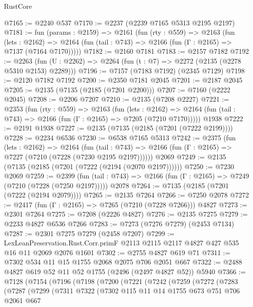 \begin{lexlean}{RustCore}
\begin{coremodule}
@7165 := @2240 @537
@7170 := @2237 (@2239 @7165 @5313 @2195 @2197)
@7181 := fun (params : @2159) =>
  @2161
    (fun (rty : @559) =>
    @2163
      (fun (lets : @2162) =>
      @2164 (fun (tail : @743) => @2166 (fun (Γ : @2165) => @7137 (@7164 @7170)))))
@7182 := @2160 @7181
@7183 := @2157 @7182
@7192 := @2263 (fun (U : @2262) => @2264 (fun (t : @7) => @2272 (@2135 (@2278 @5310 @2153) @2289)))
@7196 := @7157 (@7183 @7192) (@2345 @7129)
@7198 := @2120 @7182 @7192
@7200 := @2350 @7181 @2045
@7201 := @2187 @2045
@7205 := @2135 (@7135 (@2185 (@7201 @2200)))
@7207 := @7160 (@2222 @2045)
@7208 := @2206 @7207
@7210 := @2135 (@7208 @2227)
@7221 := @2353
    (fun (rty : @559) =>
    @2163
      (fun (lets : @2162) =>
      @2164 (fun (tail : @743) => @2166 (fun (Γ : @2165) => @7205 (@7210 @7170)))))
    @1938
@7222 := @2191 @1938
@7227 := @2135 (@7135 (@2185 (@7201 (@7222 @2199))))
@7228 := @2234 @6536
@7230 := @6538 @7165 @5313
@7242 := @2375
    (fun (lets : @2162) =>
    @2164
      (fun (tail : @743) => @2166 (fun (Γ : @2165) => @7227 (@7210 (@7228 (@7230 @2195 @2197))))))
    @2069
@7249 := @2135 (@7135 (@2185 (@7201 (@7222 (@2194 (@2070 @2197))))))
@7250 := @7230 @2069
@7259 := @2399
    (fun (tail : @743) => @2166 (fun (Γ : @2165) => @7249 (@7210 (@7228 (@7250 @2197)))))
    @2078
@7264 := @7135 (@2185 (@7201 (@7222 (@2194 @2079))))
@7265 := @2135 @7264
@7266 := @7250 @2078
@7272 := @2417 (fun (Γ : @2165) => @7265 (@7210 (@7228 @7266))) @4827
@7273 := @2301 @7264
@7275 := @7208 (@2226 @4827)
@7276 := @2135 @7275
@7279 := @2233 @4827 @6536 @7266
@7283 := @7273 (@7276 @7279) (@2453 @7134)
@7287 := @2301 @7275 @7279 (@2458 @7207)
@7299 := LexLeanPreservation.Rust.Corr.primF
    @2113
    @2115
    @2117
    @4827
    @427
    @535
    @16
    @11
    @2069
    @2076
    @1601
@7302 := @2755 @4827 @619 @71
@7311 := @7302 @534 @11 @15 @1755 @2068 @2075 @706 @2051 @667
@7322 := @2488 @4827 @619 @52 @11 @52 @1755 (@2496 (@2497 @4827 @52)) @5940
@7366 := @7128
    (@7154
      (@7196
        (@7198
          (@7200
            (@7221
              (@7242
                (@7259
                  (@7272
                    (@7283
                      (@7287
                        (@7299
                          (@7311
                            @7322
                            (@7302
                              @115
                              @11
                              @14
                              @1755
                              @673
                              @751
                              @706
                              @2061
                              @667

\end{coremodule}
\end{lexlean}
